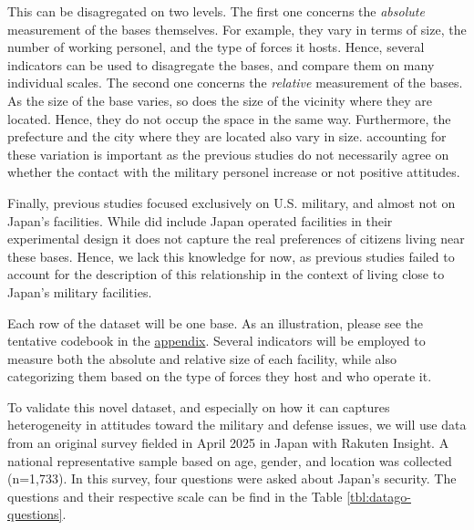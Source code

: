 \documentclass[12pt]{article}
\begin{document}
This can be disagregated on two levels. The first one concerns the
\textit{absolute} measurement of the bases themselves. For example,
they vary in terms of size, the number of working personel, and the
type of forces it hosts. Hence, several indicators can be used to
disagregate the bases, and compare them on many individual scales.
The second one concerns the \textit{relative} measurement of the
bases. As the size of the base varies, so does the size of the vicinity 
where they are located. Hence, they do not occup the space in the same 
way. Furthermore, the prefecture and the city where they are located 
also vary in size. accounting for these variation is important as 
the previous studies do not necessarily agree on whether the contact 
with the military personel increase or not positive attitudes. 

Finally, previous studies focused exclusively on U.S. military, 
and almost not on Japan's facilities. While \textcite{horiuchi_tago23}
did include Japan operated facilities in their experimental design 
it does not capture the real preferences of citizens living near 
these bases. Hence, we lack this knowledge for now, as previous 
studies failed to account for the description of this relationship 
in the context of living close to Japan's military facilities. 

Each row of the dataset will be one base. As an illustration, please 
see the tentative codebook in the \href{appendix}{appendix}. Several 
indicators will be employed to measure both the absolute and relative 
size of each facility, while also categorizing them based on the type 
of forces they host and who operate it. 

To validate this novel dataset, and especially on how it can captures 
heterogeneity in attitudes toward the military and defense issues, 
we will use data from an original survey fielded in April 2025 in 
Japan with Rakuten Insight. A national representative sample based on 
age, gender, and location was collected (n=1,733). In this survey, 
four questions were asked about Japan's security. The questions and 
their respective scale can be find in the Table \ref{tbl:datago-questions}.
\end{document}
